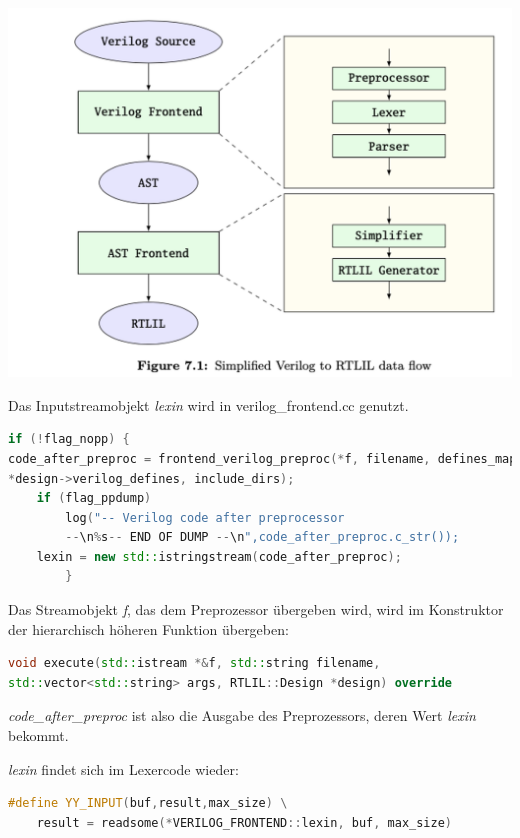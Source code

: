 \documentclass[11pt]{report}
\begin{document}
\begin{center}
\includegraphics[scale=0.5]{verilogtortlil.png}
\end{center}

Das Inputstreamobjekt \textit{lexin} wird in verilog\_frontend.cc genutzt.

\begin{lstlisting}[language=C++]
if (!flag_nopp) {
code_after_preproc = frontend_verilog_preproc(*f, filename, defines_map, 
*design->verilog_defines, include_dirs);
	if (flag_ppdump)
		log("-- Verilog code after preprocessor
	 	--\n%s-- END OF DUMP --\n",code_after_preproc.c_str());
	lexin = new std::istringstream(code_after_preproc);
		}
\end{lstlisting} 

Das Streamobjekt \textit{f}, das dem Preprozessor übergeben wird, wird im Konstruktor der hierarchisch höheren Funktion übergeben:
\begin{lstlisting}[language=C++]
void execute(std::istream *&f, std::string filename,
std::vector<std::string> args, RTLIL::Design *design) override
\end{lstlisting}

\textit{code\_after\_preproc} ist also die Ausgabe des Preprozessors, deren Wert \textit{lexin} bekommt.

\textit{lexin} findet sich im Lexercode wieder:

\begin{lstlisting}[language=C++]
	#define YY_INPUT(buf,result,max_size) \
	result = readsome(*VERILOG_FRONTEND::lexin, buf, max_size)
\end{lstlisting}
\end{document}
